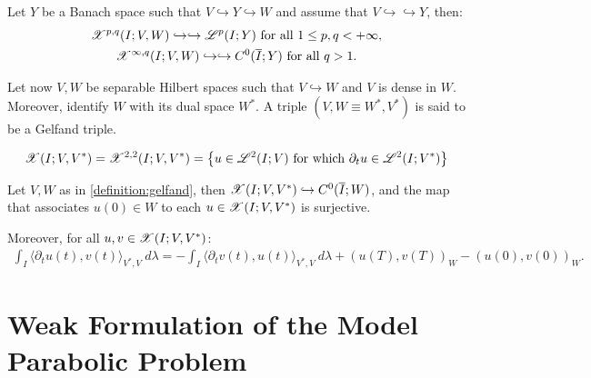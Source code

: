 \begin{theorem}
    Let $Y$ be a Banach space such that $V \hookrightarrow Y \hookrightarrow W$ and assume that $V \hookrightarrow \hookrightarrow Y$, then:
    \begin{gather}
        \mathscr{X}^{p, q}(I; V, W) \hookrightarrow \hookrightarrow \mathscr{L}^{p}(I; Y) \text{ for all } 1 \leq p, q < +\infty,\\
        \mathscr{X}^{\infty, q}(I; V, W) \hookrightarrow \hookrightarrow C^0(\overline{I}; Y) \text{ for all } q > 1.
    \end{gather}
\end{theorem}

\begin{definition} \label{definition:gelfand}
    Let now $V, W$ be separable Hilbert spaces such that $V \hookrightarrow W$ and $V$ is dense in $W$. Moreover, identify $W$ with its dual space $W^*$. A triple $\left( V, W \equiv W^*, V^* \right)$ is said to be a Gelfand triple.
\end{definition}

\begin{definition}[$\SpaceX(I; V, V^*)$] \label{definition:x}
    \begin{gather}
        \mathscr{X}(I; V, V^*) = \mathscr{X}^{2, 2}(I; V, V^*) = \left\{ u \in \mathscr{L}^{2}(I; V) \text{ for which } \partial_t u \in \mathscr{L}^{2}(I; V^*) \right\}
    \end{gather}
\end{definition}

\begin{theorem}
    Let $V, W$ as in \ref{definition:gelfand}, then \newline \nobreak $\mathscr{X}(I; V, V^*) \hookrightarrow C^0(\overline{I};W)$, and the map that associates $u(0) \in W$ to each $u \in \mathscr{X}(I; V, V^*)$ is surjective.

    Moreover, for all $u, v \in \mathscr{X}(I; V, V^*)$:
    \begin{gather}
        \int_I \langle \partial_t u(t), v(t) \rangle_{V^*, V} ~ d \lambda = - \int_I \langle \partial_t v(t), u(t) \rangle_{V^*, V} ~ d \lambda + \left( u(T), v(T) \right)_W - \left( u(0), v(0) \right)_W.
    \end{gather}
\end{theorem}

\newpage
\section{Weak Formulation of the Model Parabolic Problem}


